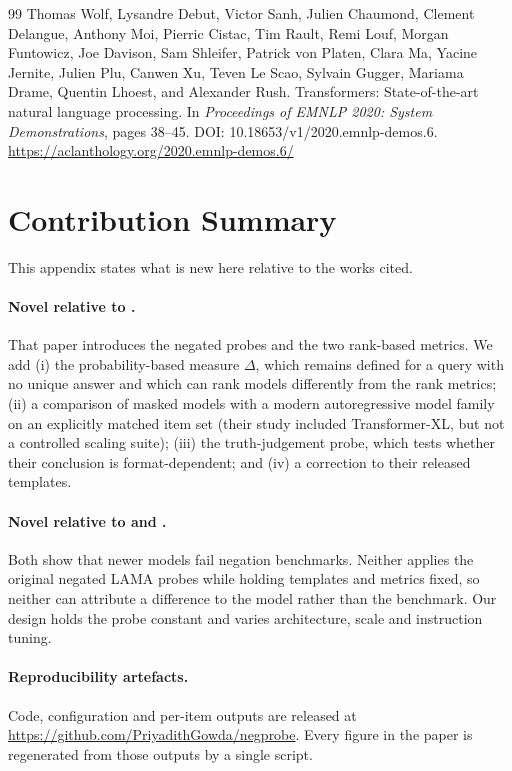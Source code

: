 \documentclass{article}
\begin{document}
\begin{thebibliography}{99}
Thomas Wolf, Lysandre Debut, Victor Sanh, Julien Chaumond, Clement Delangue, Anthony Moi, Pierric
Cistac, Tim Rault, Remi Louf, Morgan Funtowicz, Joe Davison, Sam Shleifer, Patrick von Platen, Clara
Ma, Yacine Jernite, Julien Plu, Canwen Xu, Teven Le Scao, Sylvain Gugger, Mariama Drame, Quentin
Lhoest, and Alexander Rush.
Transformers: State-of-the-art natural language processing.
In \emph{Proceedings of EMNLP 2020: System Demonstrations}, pages 38--45.
DOI: 10.18653/v1/2020.emnlp-demos.6. \url{https://aclanthology.org/2020.emnlp-demos.6/}

\end{thebibliography}

\appendix

\section{Contribution Summary}
\label{app:contribution}

This appendix states what is new here relative to the works cited.

\paragraph{Novel relative to \citet{kassner2020}.} That paper introduces the negated probes and the two
rank-based metrics. We add (i) the probability-based measure $\Delta$, which remains defined for a
query with no unique answer and which can rank models differently from the rank metrics; (ii) a comparison
of masked models with a modern autoregressive model family on an explicitly matched item set (their study included Transformer-XL, but not a controlled scaling suite);
(iii) the truth-judgement probe, which tests whether their conclusion is format-dependent; and (iv) a
correction to their released templates.

\paragraph{Novel relative to \citet{truong2023} and \citet{garciaferrero2023}.} Both show that newer
models fail negation benchmarks. Neither applies the original negated LAMA probes while holding
templates and metrics fixed, so neither can attribute a difference to the model rather than the
benchmark. Our design holds the probe constant and varies architecture, scale and instruction tuning.

\paragraph{Reproducibility artefacts.} Code, configuration and per-item outputs are released at
\url{https://github.com/PriyadithGowda/negprobe}. Every figure in the paper is regenerated from those outputs by a single
script.
\end{document}
